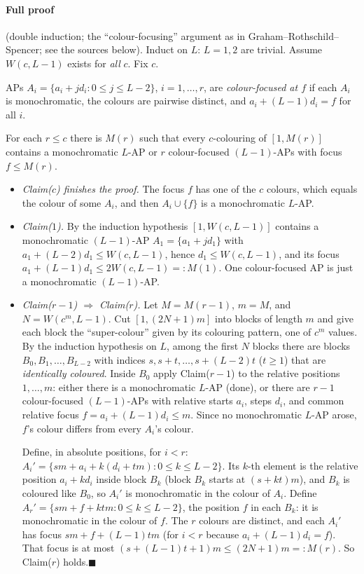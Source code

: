 \documentclass[11pt]{article}
\begin{document}
\paragraph{Full proof} (double induction; the ``colour-focusing'' argument as in Graham--Rothschild--Spencer; see the sources below). Induct on $L$: $L=1,2$ are trivial. Assume $W(c,L-1)$ exists for \emph{all} $c$. Fix $c$.

\begin{definition}
APs $A_i=\{a_i+jd_i:0\le j\le L-2\}$, $i=1,\dots,r$, are \emph{colour-focused at $f$} if each $A_i$ is monochromatic, the colours are pairwise distinct, and $a_i+(L-1)d_i=f$ for all $i$.
\end{definition}

\begin{claim}[$r$]
For each $r\le c$ there is $M(r)$ such that every $c$-colouring of $[1,M(r)]$ contains a monochromatic $L$-AP or $r$ colour-focused $(L-1)$-APs with focus $f\le M(r)$.
\end{claim}

\begin{itemize}[nosep]
  \item \emph{Claim($c$) finishes the proof.} The focus $f$ has one of the $c$ colours, which equals the colour of some $A_i$, and then $A_i\cup\{f\}$ is a monochromatic $L$-AP.
  \item \emph{Claim($1$).} By the induction hypothesis $[1,W(c,L-1)]$ contains a monochromatic $(L-1)$-AP $A_1=\{a_1+jd_1\}$ with $a_1+(L-2)d_1\le W(c,L-1)$, hence $d_1\le W(c,L-1)$, and its focus $a_1+(L-1)d_1\le 2W(c,L-1)=:M(1)$. One colour-focused AP is just a monochromatic $(L-1)$-AP.
  \item \emph{Claim($r-1$) $\Rightarrow$ Claim($r$).} Let $M=M(r-1)$, $m=M$, and $N=W(c^{m},L-1)$. Cut $[1,(2N+1)m]$ into blocks of length $m$ and give each block the ``super-colour'' given by its colouring pattern, one of $c^m$ values. By the induction hypothesis on $L$, among the first $N$ blocks there are blocks $B_0,B_1,\dots,B_{L-2}$ with indices $s,s+t,\dots,s+(L-2)t$ ($t\ge1$) that are \emph{identically coloured}. Inside $B_0$ apply Claim($r-1$) to the relative positions $1,\dots,m$: either there is a monochromatic $L$-AP (done), or there are $r-1$ colour-focused $(L-1)$-APs with relative starts $a_i$, steps $d_i$, and common relative focus $f=a_i+(L-1)d_i\le m$. Since no monochromatic $L$-AP arose, $f$'s colour differs from every $A_i$'s colour.

  Define, in absolute positions, for $i<r$: $A_i'=\{sm+a_i+k(d_i+tm):0\le k\le L-2\}$. Its $k$-th element is the relative position $a_i+kd_i$ inside block $B_k$ (block $B_k$ starts at $(s+kt)m$), and $B_k$ is coloured like $B_0$, so $A_i'$ is monochromatic in the colour of $A_i$. Define $A_r'=\{sm+f+ktm:0\le k\le L-2\}$, the position $f$ in each $B_k$: it is monochromatic in the colour of $f$. The $r$ colours are distinct, and each $A_i'$ has focus $sm+f+(L-1)tm$ (for $i<r$ because $a_i+(L-1)d_i=f$). That focus is at most $(s+(L-1)t+1)m\le(2N+1)m=:M(r)$. So Claim($r$) holds.\hfill$\blacksquare$
\end{itemize}
\end{document}
